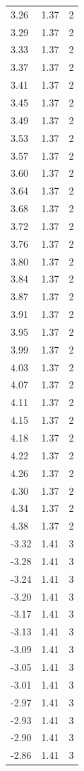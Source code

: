 \begin{longtable}{lrr}
  3.26 & 1.37 & 2 \\
  3.29 & 1.37 & 2 \\
  3.33 & 1.37 & 2 \\
  3.37 & 1.37 & 2 \\
  3.41 & 1.37 & 2 \\
  3.45 & 1.37 & 2 \\
  3.49 & 1.37 & 2 \\
  3.53 & 1.37 & 2 \\
  3.57 & 1.37 & 2 \\
  3.60 & 1.37 & 2 \\
  3.64 & 1.37 & 2 \\
  3.68 & 1.37 & 2 \\
  3.72 & 1.37 & 2 \\
  3.76 & 1.37 & 2 \\
  3.80 & 1.37 & 2 \\
  3.84 & 1.37 & 2 \\
  3.87 & 1.37 & 2 \\
  3.91 & 1.37 & 2 \\
  3.95 & 1.37 & 2 \\
  3.99 & 1.37 & 2 \\
  4.03 & 1.37 & 2 \\
  4.07 & 1.37 & 2 \\
  4.11 & 1.37 & 2 \\
  4.15 & 1.37 & 2 \\
  4.18 & 1.37 & 2 \\
  4.22 & 1.37 & 2 \\
  4.26 & 1.37 & 2 \\
  4.30 & 1.37 & 2 \\
  4.34 & 1.37 & 2 \\
  4.38 & 1.37 & 2 \\
  -3.32 & 1.41 & 3 \\
  -3.28 & 1.41 & 3 \\
  -3.24 & 1.41 & 3 \\
  -3.20 & 1.41 & 3 \\
  -3.17 & 1.41 & 3 \\
  -3.13 & 1.41 & 3 \\
  -3.09 & 1.41 & 3 \\
  -3.05 & 1.41 & 3 \\
  -3.01 & 1.41 & 3 \\
  -2.97 & 1.41 & 3 \\
  -2.93 & 1.41 & 3 \\
  -2.90 & 1.41 & 3 \\
  -2.86 & 1.41 & 3 \\

\end{longtable}
